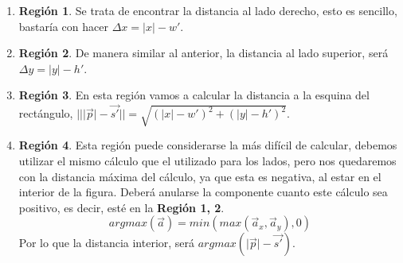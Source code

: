 \begin{enumerate}
    \item \textbf{Región 1}. Se trata de encontrar la distancia al lado derecho, esto es sencillo, bastaría con hacer \(\Delta x=\vert x\vert-w'\).
    \item \textbf{Región 2}. De manera similar al anterior, la distancia al lado superior, será \(\Delta y=\vert y\vert-h'\).
    \item \textbf{Región 3}. En esta región vamos a calcular la distancia a la esquina del rectángulo, \(\vert\vert \vert\Vec{p}\vert-\Vec{s'}\vert\vert = \sqrt{\left(\vert x\vert-w'\right)^2+\left(\vert y\vert-h'\right)^2}\).
    \item \textbf{Región 4}. Esta región puede considerarse la más difícil de calcular, debemos utilizar el mismo cálculo que el utilizado para los lados, pero nos quedaremos con la distancia máxima del cálculo, ya que esta es negativa, al estar en el interior de la figura. Deberá anularse la componente cuanto este cálculo sea positivo, es decir, esté en la \textbf{Región 1, 2}.
    \[argmax(\Vec{a})=min(max(\Vec{a}_x, \Vec{a}_y), 0)\]
    Por lo que la distancia interior, será \(argmax(\vert\Vec{p}\vert-\Vec{s'})\).
\end{enumerate}

